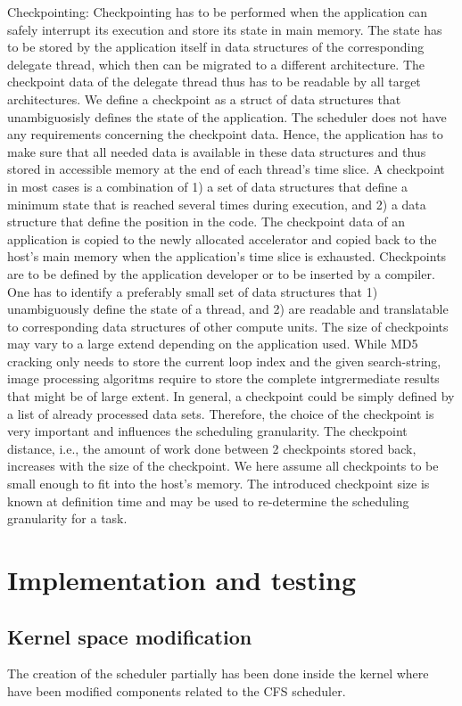 \documentclass[a4paper,13pt]{article}
\begin{document}
\begin{multicols}{2}
Checkpointing: Checkpointing has to be performed when the application can safely interrupt its 
execution and store its state in main memory. The state has to be stored by the application itself
in data structures of the corresponding delegate thread, which then can be migrated to a different
architecture. The checkpoint data of the delegate thread thus has to be readable by all target 
architectures.
We define a checkpoint as a struct of data structures that unambiguosisly defines the state of the 
application. The scheduler does not have any requirements concerning the checkpoint data. Hence, the
application has to make sure that all needed data is available in these data structures and thus
stored in accessible memory at the end of each thread's time slice. A checkpoint in most cases is a
combination of 1) a set of data structures that define a minimum state that is reached several times
during execution, and 2) a data structure that define the position in the code. The checkpoint data
of an application is copied to the newly allocated accelerator and copied back to the host's main 
memory when the application's time slice is exhausted. 
Checkpoints are to be defined by the application developer or to be inserted by a compiler. One has 
to identify a preferably small set of data structures that 1) unambiguously define the state of a 
thread, and 2) are readable and translatable to corresponding data structures of other compute units.
The size of checkpoints may vary to a large extend depending on the application used. While MD5 
cracking  only needs to store the current loop index and the given search-string, image processing 
algoritms require to store the complete intgrermediate results that might be of large extent.
In general, a checkpoint could be simply defined by a list of already processed data sets. Therefore,
the choice of the checkpoint is very important and influences the scheduling granularity. The 
checkpoint distance, i.e., the amount of work done between 2 checkpoints stored back, increases with
the size of the checkpoint.
We here assume all checkpoints to be small enough to fit into the host's memory. The introduced 
checkpoint size is known at definition time and may be used to re-determine the scheduling granularity
for a task. 

\section{Implementation and testing}
\subsection{Kernel space modification}
The creation of the scheduler partially has been done inside the kernel where have been modified 
components related to the CFS scheduler.
\\


\end{multicols}
\end{document}
